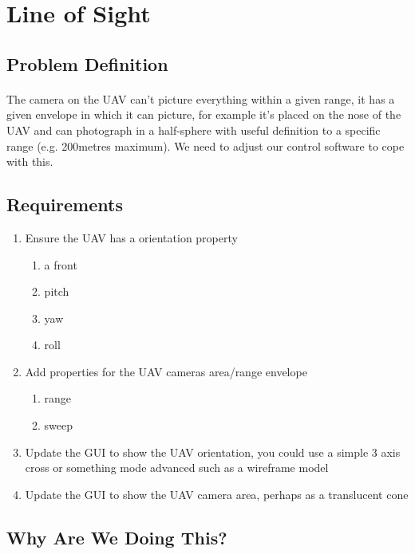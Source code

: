 \documentclass[11pt]{book}
\begin{document}
\clearpage

\section{Line of Sight}

\subsection{Problem Definition}

\paragraph{} The camera on the UAV can't picture everything within a given
range, it has a given envelope in which it can picture, for example it's
placed on the nose of the UAV and can photograph in a half-sphere with useful
definition to a specific range (e.g. 200metres maximum). We need to adjust our
control software to cope with this.

\subsection{Requirements}

\begin{enumerate}
\item Ensure the UAV has a orientation property
     \begin{enumerate}
         \item a front
         \item pitch
         \item yaw
         \item roll
     \end{enumerate}
\item Add properties for the UAV cameras area/range envelope
     \begin{enumerate}
         \item range
         \item sweep
     \end{enumerate}
\item Update the GUI to show the UAV orientation, you could use a simple 3 axis cross or something mode advanced such as a wireframe model
\item Update the GUI to show the UAV camera area, perhaps as a translucent cone
\end{enumerate}

\subsection{Why Are We Doing This?}
\end{document}
